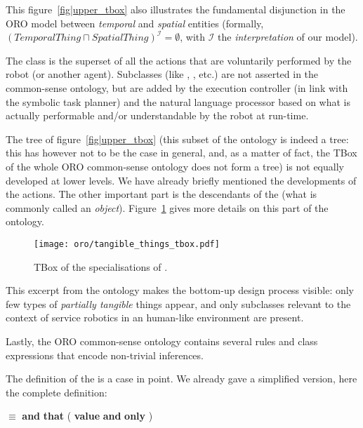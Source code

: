 This figure~\ref{fig|upper_tbox} also illustrates the fundamental disjunction
in the ORO model between \emph{temporal} and \emph{spatial} entities (formally,
$(TemporalThing \sqcap SpatialThing)^{\mathcal{I}} = \emptyset$, with
$\mathcal{I}$ the \emph{interpretation} of our model).

The class  is the superset of all the actions that
are voluntarily performed by the robot (or another agent). Subclasses (like
, , etc.) are not asserted in the common-sense
ontology, but are added by the execution controller (in link with the symbolic
task planner) and the natural language processor based on what is actually
performable and/or understandable by the robot at run-time.

The tree of figure~\ref{fig|upper_tbox} (this subset of the ontology is indeed
a tree: this has however not to be the case in general, and, as a matter of
fact, the TBox of the whole ORO common-sense ontology does not form a tree) is
not equally developed at lower levels. We have already briefly mentioned the
developments of the actions. The other important part is the descendants of the
 (what is commonly called an \emph{object}).
Figure~\ref{fig|tangible_things_tbox} gives more details on this part of the
ontology.

\begin{figure}
    \centering
    \texttt{[image: oro/tangible\_things\_tbox.pdf]}
    \caption{TBox of the specialisations of .}
    \label{fig|tangible_things_tbox}
\end{figure}

This excerpt from the ontology makes the bottom-up design process visible: only
few types of \emph{partially tangible} things appear, and only subclasses
relevant to the context of service robotics in an human-like environment are
present.

Lastly, the ORO common-sense ontology contains several rules and class
expressions that encode non-trivial inferences.

The definition of the  is a case in point. We already gave a
simplified version, here the complete definition:

 $\equiv$  {\bf and} 
{\bf that} ( {\bf value}  {\bf and}
 {\bf only} )

